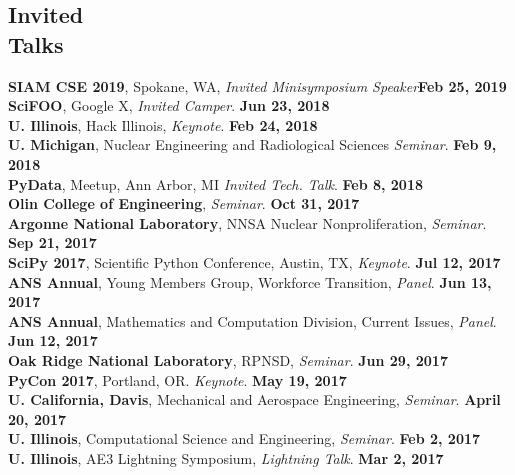 \documentclass[margin,line]{resume}
\begin{document}
\begin{resume}
    \section{\mysidestyle Invited\\Talks}
    \textbf{SIAM CSE 2019}, Spokane, WA, \emph{Invited Minisymposium Speaker}\hfill\textbf{Feb 25, 2019}\\
      \textbf{SciFOO}, Google X, \emph{Invited Camper}.  \hfill\textbf{Jun 23, 2018}\\
      \textbf{U. Illinois}, Hack Illinois, \emph{Keynote}.  \hfill\textbf{Feb 24, 2018}\\
      \textbf{U. Michigan}, Nuclear Engineering and Radiological Sciences \emph{Seminar}.  \hfill\textbf{Feb 9, 2018}\\
      \textbf{PyData}, Meetup, Ann Arbor, MI \emph{Invited Tech. Talk}.  \hfill\textbf{Feb 8, 2018}\\
      \textbf{Olin College of Engineering}, \emph{Seminar}.  \hfill\textbf{Oct 31, 2017}\\
      \textbf{Argonne National Laboratory}, NNSA Nuclear Nonproliferation, \emph{Seminar}.  \hfill\textbf{Sep 21, 2017}\\
      \textbf{SciPy 2017}, Scientific Python Conference, Austin, TX, \emph{Keynote}.  \hfill\textbf{Jul 12, 2017}\\
      \textbf{ANS Annual}, Young Members Group, Workforce Transition, \emph{Panel}.  \hfill\textbf{Jun 13, 2017}\\
      \textbf{ANS Annual}, Mathematics and Computation Division, Current Issues, \emph{Panel}.  \hfill\textbf{Jun 12, 2017}\\
      \textbf{Oak Ridge National Laboratory}, RPNSD, \emph{Seminar}.  \hfill\textbf{Jun 29, 2017}\\
      \textbf{PyCon 2017}, Portland, OR. \emph{Keynote}.  \hfill\textbf{May 19, 2017}\\
      \textbf{U. California, Davis}, Mechanical and Aerospace Engineering, \emph{Seminar}.  \hfill\textbf{April 20, 2017}\\
      \textbf{U. Illinois}, Computational Science and Engineering, \emph{Seminar}.  \hfill\textbf{Feb 2, 2017}\\
      \textbf{U. Illinois}, AE3 Lightning Symposium, \emph{Lightning Talk}.  \hfill\textbf{Mar 2, 2017}\\

\end{resume}
\end{document}
